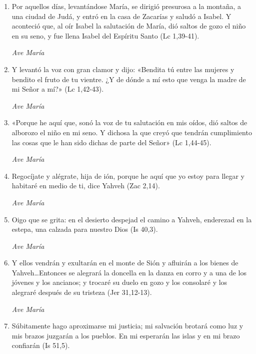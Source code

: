 \documentclass[a4paper,11pt, oneside]{report}
\begin{document}
        \begin{enumerate}
          
          \item Por aquellos días, levantándose María, se dirigió presurosa a la montaña, a una ciudad de Judá, y entró en la casa de Zacarías y saludó
          a Isabel. Y aconteció que, al oír Isabel la salutación de María, dió saltos de gozo el niño en su seno, y fue llena Isabel del Espíritu Santo 
          (Lc 1,39-41).
          
          \textit{Ave María}

          \item Y levantó la voz con gran clamor y dijo: «Bendita tú entre las mujeres y bendito el fruto de tu vientre. ¿Y de dónde a mí esto que venga
          la madre de mi Señor a mí?» (Lc 1,42-43).
          
          \textit{Ave María}

          \item «Porque he aquí que, sonó la voz de tu salutación en mis oídos, dió saltos de alborozo el niño en mi seno. Y dichosa la que creyó que 
          tendrán cumplimiento las cosas que le han sido dichas de parte del Señor» (Lc 1,44-45).
          
          \textit{Ave María}

          \item Regocíjate y alégrate, hija de ión, porque he aquí que yo estoy para llegar y habitaré en medio de ti, dice Yahveh (Zac 2,14).
          
          \textit{Ave María}

          \item Oigo que se grita: en el desierto despejad el camino a Yahveh, enderezad en la estepa, una calzada para nuestro Dios (Is 40,3).

          \textit{Ave María}

          \item Y ellos vendrán y exultarán en el monte de Sión y afluirán a los bienes de Yahveh\ldots Entonces se alegrará la doncella
          en la danza en corro y a una de los jóvenes y los ancianos; y trocaré su duelo en gozo y los consolaré y los alegraré después de su tristeza
          (Jer 31,12-13).
          
          \textit{Ave María}

          \item Súbitamente hago aproximarse mi justicia; mi salvación brotará como luz y mis brazos juzgarán a los pueblos. En mi esperarán las islas
          y en mi brazo confiarán (Is 51,5).
          

\end{enumerate}
\end{document}

